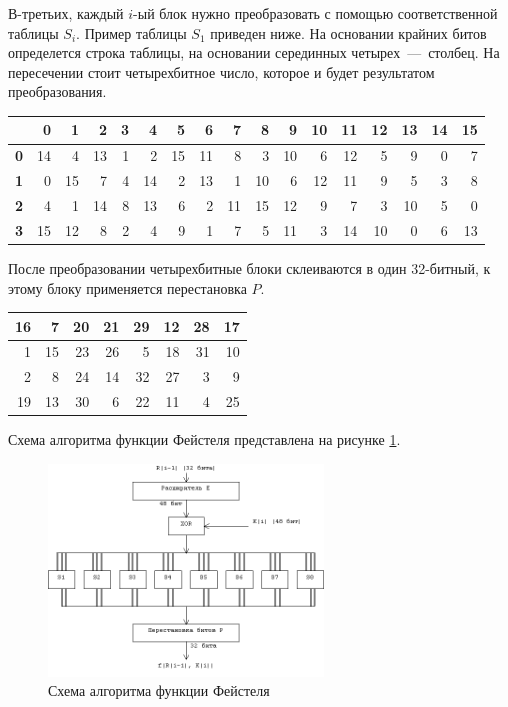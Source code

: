 В-третьих, каждый $i$-ый блок нужно преобразовать с помощью соответственной таблицы $S_i$. Пример таблицы $S_1$ приведен ниже. На основании крайних битов определется строка таблицы, на основании серединных четырех~---~столбец. На пересечении стоит четырехбитное число, которое и будет результатом преобразования.

\begin{center}
\begin{tabular}{|r|r|r|r|r|r|r|r|r|r|r|r|r|r|r|r|r|} 
 \hline
 & \textbf{0} & \textbf{1} & \textbf{2} & \textbf{3} & \textbf{4} & \textbf{5} & \textbf{6} & \textbf{7} & \textbf{8} & \textbf{9} & \textbf{10} & \textbf{11} & \textbf{12} & \textbf{13} & \textbf{14} & \textbf{15} \\ \hline
\textbf{0} & 14 & 4 & 13 & 1 & 2 & 15 & 11 & 8 & 3 & 10 & 6 & 12 & 5 & 9 & 0 & 7 \\ \hline
\textbf{1} & 0 & 15 & 7 & 4 & 14 & 2 & 13 & 1 & 10 & 6 & 12 & 11 & 9 & 5 & 3 & 8 \\ \hline
\textbf{2} & 4 & 1 & 14 & 8 & 13 & 6 & 2 & 11 & 15 & 12 & 9 & 7 & 3 & 10 & 5 & 0  \\ \hline
\textbf{3} & 15 & 12 & 8 & 2 & 4 & 9 & 1 & 7 & 5 & 11 & 3 & 14 & 10 & 0 & 6 & 13 \\ \hline
\end{tabular}
\end{center}

После преобразовании четырехбитные блоки склеиваются в один 32-битный, к этому блоку применяется перестановка $P$.

\begin{center}
\begin{tabular}{|r|r|r|r|r|r|r|r|} 
 \hline
16 & 7 & 20 & 21 & 29 & 12 & 28 & 17 \\ \hline
1 & 15 & 23 & 26 & 5 & 18 & 31 & 10 \\ \hline
2 & 8 & 24 & 14 & 32 & 27 & 3 & 9 \\ \hline
19 & 13 & 30 & 6 & 22 & 11 & 4 & 25 \\ \hline
\end{tabular}
\end{center}

Схема алгоритма функции Фейстеля представлена на рисунке \ref{fig:f}.

\begin{figure}[h!]
\centering
\includegraphics[width=0.65\textwidth]{assets/f.png}
\caption{Схема алгоритма функции Фейстеля}
\label{fig:f}
\end{figure}

